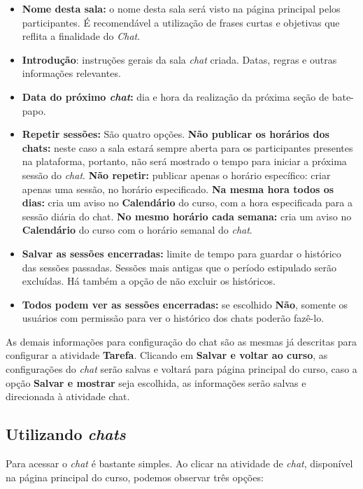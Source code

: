 \begin{itemize}
 \item \textbf{Nome desta sala:} o nome desta sala será visto na página principal pelos participantes. É recomendável a utilização de frases curtas e objetivas que reflita a finalidade do \textit{Chat}.
\item \textbf{Introdução}: instruções gerais da sala \textit{chat} criada. Datas, regras e outras informações relevantes.
\item \textbf{Data do próximo \textit{chat}:} dia e hora da realização da próxima seção de bate-papo.
\item \textbf{Repetir sessões:} São quatro opções.
\subitem \textbf{Não publicar os horários dos chats:} neste caso a sala estará sempre aberta para os participantes presentes na plataforma, portanto, não será mostrado o tempo para iniciar a próxima sessão do \textit{chat}.
\subitem  \textbf{Não repetir:} publicar apenas o horário específico: criar apenas uma sessão, no horário especificado.
\subitem  \textbf{Na mesma hora todos os dias:} cria um aviso no \textbf{Calendário} do curso, com a hora especificada para a sessão diária do chat.
\subitem  \textbf{No mesmo horário cada semana:} cria um aviso no \textbf{Calendário} do curso com o horário semanal do \textit{chat}.
\item \textbf{Salvar as sessões encerradas:} limite de tempo para guardar o histórico das sessões passadas. Sessões mais antigas que o período estipulado serão excluídas. Há também a opção de não excluir os históricos.
\item \textbf{Todos podem ver as sessões encerradas:} se escolhido \textbf{Não}, somente os usuários com permissão para ver o histórico dos chats poderão fazê-lo.
\end{itemize}

As demais informações para configuração do chat são as mesmas já descritas para configurar a atividade \textbf{Tarefa}. Clicando em \textbf{Salvar e voltar ao curso}, as configurações do \textit{chat} serão salvas e voltará para página principal do curso, caso a opção \textbf{Salvar e mostrar} seja escolhida, as informações serão salvas e direcionada à atividade chat.

\subsection{Utilizando \textit{chats}}

Para acessar o \textit{chat} é bastante simples. Ao clicar na atividade de \textit{chat}, disponível na página principal do curso, podemos observar três opções:

